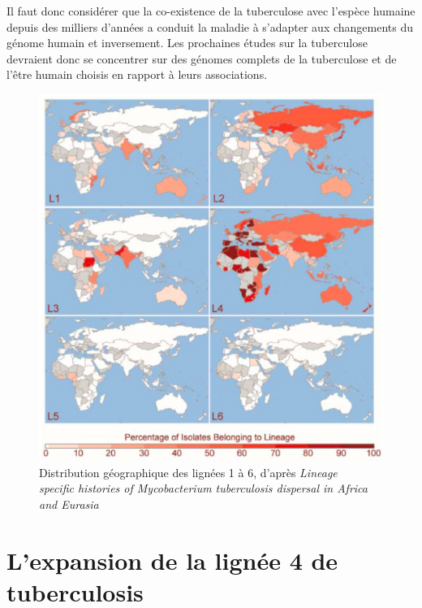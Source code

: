 \documentclass[twoside,a4paper,11pt,frenchb,openany]{report}
\begin{document}

Il faut donc considérer que la co-existence de la tuberculose avec l'espèce humaine depuis des milliers d'années a conduit la maladie à s'adapter aux changements du génome humain et inversement. Les prochaines études sur la tuberculose devraient donc se concentrer sur des génomes complets de la tuberculose et de l'être humain choisis en rapport à leurs associations.

\begin{figure}
\includegraphics[scale=0.5]{world.png}
\caption{Distribution géographique des lignées 1 à 6, d'après \textit{Lineage\\ specific histories of Mycobacterium tuberculosis dispersal in Africa and Eurasia}}
\end{figure}


\section{L'expansion de la lignée 4 de tuberculosis}

\end{document}

